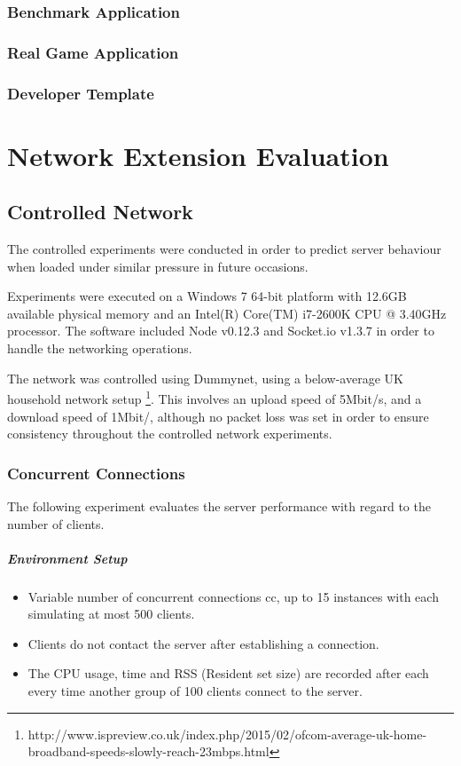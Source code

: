 \documentclass[bsc,frontabs,twoside,singlespacing,parskip,deptreport]{infthesis}     %
\begin{document}
\subsection{Benchmark Application}
\subsection{Real Game Application}
\subsection{Developer Template}







\chapter{Network Extension Evaluation}

\section{Controlled Network}
The controlled experiments were conducted in order to predict server behaviour when loaded under similar pressure in future occasions. 

Experiments were executed on a Windows 7 64-bit platform with 12.6GB available physical memory and an Intel(R) Core(TM) i7-2600K CPU @ 3.40GHz processor. The software included Node v0.12.3 and Socket.io v1.3.7 in order to handle the networking operations.

The network was controlled using Dummynet, using a below-average UK household network setup \footnote{http://www.ispreview.co.uk/index.php/2015/02/ofcom-average-uk-home-broadband-speeds-slowly-reach-23mbps.html}. This involves an upload speed of 5Mbit/s, and a download speed of 1Mbit/, although no packet loss was set in order to ensure consistency throughout the controlled network experiments.

\subsection{Concurrent Connections}
The following experiment evaluates the server performance with regard to the number of clients.

\paragraph*{Environment Setup}
\begin{itemize}
\item Variable number of concurrent connections cc, up to 15 instances with each simulating at most 500 clients.
\item Clients do not contact the server after establishing a connection.
\item The CPU usage, time and RSS (Resident set size) are recorded after each every time another group of 100 clients connect to the server.
\end{itemize}
\end{document}

